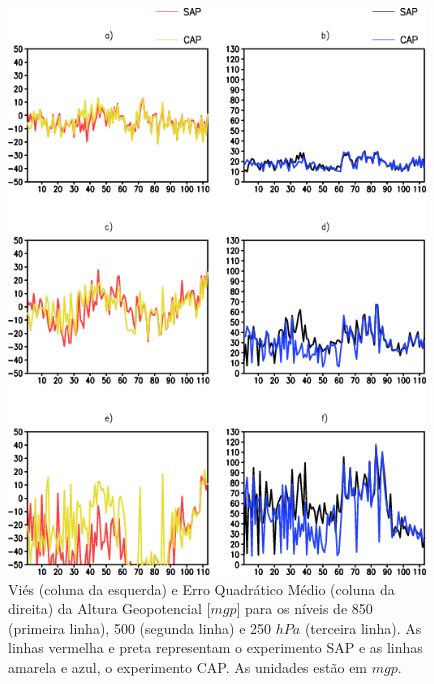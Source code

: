 \begin{figure}[!hbp]
\centering
\includegraphics[height=15cm]{./figs/vies_eqm-zgeo.png}
\caption{Viés (coluna da esquerda) e Erro Quadrático Médio (coluna da direita) da Altura Geopotencial [$mgp$] para os níveis de 850 (primeira linha), 500 (segunda linha) e 250 $hPa$ (terceira linha). As linhas vermelha e preta representam o experimento SAP e as linhas amarela e azul, o experimento CAP. As unidades estão em $mgp$.}
\label{fig30a}
\end{figure}

